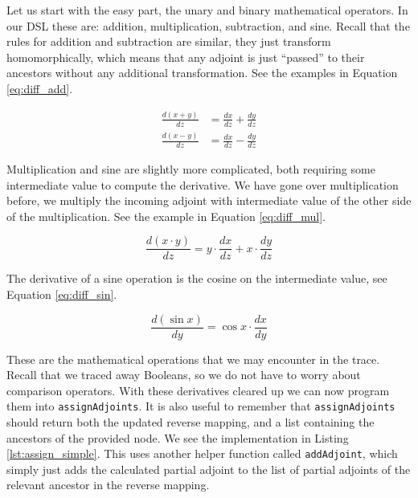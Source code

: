        Let us start with the easy part, the unary and binary mathematical operators.
        In our DSL these are: addition, multiplication, subtraction, and sine.
        Recall that the rules for addition and subtraction are similar, they just transform homomorphically, which means that any adjoint is just ``passed'' to their ancestors without any additional transformation.
        See the examples in Equation \ref{eq:diff_add}.

        \begin{equation} \label{eq:diff_add}
            \begin{aligned}
                \frac{d(x+y)}{dz}&=\frac{dx}{dz}+\frac{dy}{dz}\\
                \frac{d(x-y)}{dz}&=\frac{dx}{dz}-\frac{dy}{dz}
            \end{aligned}
        \end{equation}

        Multiplication and sine are slightly more complicated, both requiring some intermediate value to compute the derivative.
        We have gone over multiplication before, we multiply the incoming adjoint with intermediate value of the other side of the multiplication.
        See the example in Equation \ref{eq:diff_mul}.

        \begin{equation} \label{eq:diff_mul}
            \frac{d(x\cdot y)}{dz}=y\cdot\frac{dx}{dz}+x\cdot\frac{dy}{dz}
        \end{equation}

        The derivative of a sine operation is the cosine on the intermediate value, see Equation \ref{eq:diff_sin}.

        \begin{equation} \label{eq:diff_sin}
            \frac{d(\sin x)}{dy}=\cos x\cdot\frac{dx}{dy}
        \end{equation}

        These are the mathematical operations that we may encounter in the trace.
        Recall that we traced away Booleans, so we do not have to worry about comparison operators.
        With these derivatives cleared up we can now program them into \texttt{assignAdjoints}.
        It is also useful to remember that \texttt{assignAdjoints} should return both the updated reverse mapping, and a list containing the ancestors of the provided node.
        We see the implementation in Listing \ref{lst:assign_simple}.
        This uses another helper function called \texttt{addAdjoint}, which simply just adds the calculated partial adjoint to the list of partial adjoints of the relevant ancestor in the reverse mapping.

